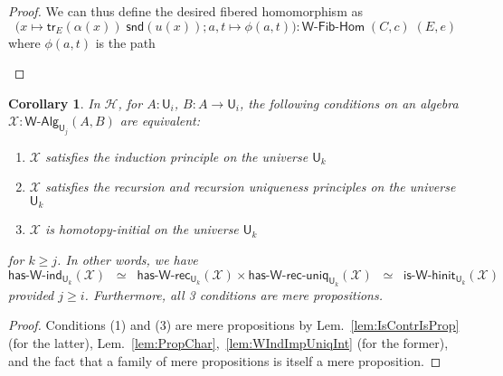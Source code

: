 \documentclass[reqno,10pt,a4paper,oneside]{amsart}
\newcommand{\X}{\mathcal{X}}
\newcommand{\fst}{\mathsf{fst}}
\newcommand{\snd}{\mathsf{snd}}
\newcommand{\lam}[1]{\lambda_{#1}}
\newcommand{\refl}{\mathsf{refl}}
\newcommand{\W}{\mathsf{W}}
\newcommand{\funext}{\leftidx{^\Pi}{\mathsf{Eq}}^{=}}
\newcommand{\happly}{\leftidx{^=}{\mathsf{Eq}}^{\Pi}}
\newcommand{\idtodpair}{\leftidx{^=}{\mathsf{Eq}}^{\Sigma}}
\newcommand{\UU}{\mathsf{U}}
\newcommand{\WAlg}{\mathsf{W}\text{-}\mathsf{Alg}}
\newcommand{\WFibHom}{\mathsf{W}\text{-}\mathsf{Fib}\text{-}\mathsf{Hom}}
\newcommand{\HasWRec}{\mathsf{has}\text{-}\mathsf{W}\text{-}\mathsf{rec}}
\newcommand{\HasWInd}{\mathsf{has}\text{-}\mathsf{W}\text{-}\mathsf{ind}}
\newcommand{\HasWRecUniq}{\mathsf{has}\text{-}\mathsf{W}\text{-}\mathsf{rec}\text{-}\mathsf{uniq}}
\newcommand{\IsWHInit}{\mathsf{is}\text{-}\mathsf{\W}\text{-}\mathsf{hinit}}
\newcommand{\app}{\mathsf{ap}}
\newcommand{\trans}{\mathsf{tr}}
\newcommand{\Hint}{\mathcal{H}}
\newcommand{\ct}{%
  \mathchoice{\mathbin{\raisebox{0.5ex}{$\displaystyle\centerdot$}}}%
             {\mathbin{\raisebox{0.5ex}{$\centerdot$}}}%
             {\mathbin{\raisebox{0.25ex}{$\scriptstyle\,\centerdot\,$}}}%
             {\mathbin{\raisebox{0.1ex}{$\scriptscriptstyle\,\centerdot\,$}}}}
\numberwithin{equation}{section}
\theoremstyle{mythm}
\newtheorem{corollary}[theorem]{Corollary}
\theoremstyle{mydef}
\theoremstyle{myrmk}
\begin{document}
\begin{proof}
We can thus define the desired fibered homomorphism as \[\Big(x \mapsto \trans_E(\alpha(x)) \; \snd(u(x)); a,t \mapsto \phi(a,t) \Big) : \WFibHom \; (C,c) \; (E,e)\]
where $\phi(a,t)$ is the path
\begin{center}
\end{center}
\end{proof}

\begin{corollary}\label{lem:WMainInt}
In $\Hint$, for $A:\UU_i$, $B : A \to \UU_i$, the following conditions on an algebra $\X : \WAlg_{\UU_j}(A,B)$ are equivalent:
\begin{enumerate}
\item $\X$ satisfies the induction principle on the universe $\UU_k$
\item $\X$ satisfies the recursion and recursion uniqueness principles on the universe $\UU_k$
\item $\X$ is homotopy-initial on the universe $\UU_k$  
\end{enumerate}
for $k \geq j$. In other words, we have \[ \HasWInd_{\UU_k}(\X)  \;\; \simeq \;\; \HasWRec_{\UU_k}(\X) \times \HasWRecUniq_{\UU_k}(\X) \;\; \simeq \;\; \IsWHInit_{\UU_k}(\X) \]
provided $j \geq i$. Furthermore, all 3 conditions are mere propositions.
\end{corollary}
\begin{proof}
Conditions (1) and (3) are mere propositions by Lem.~\ref{lem:IsContrIsProp} (for the latter), Lem.~\ref{lem:PropChar},~\ref{lem:WIndImpUniqInt} (for the former), and the fact that a family of mere propositions is itself a mere proposition.
\end{proof}
\end{document}
